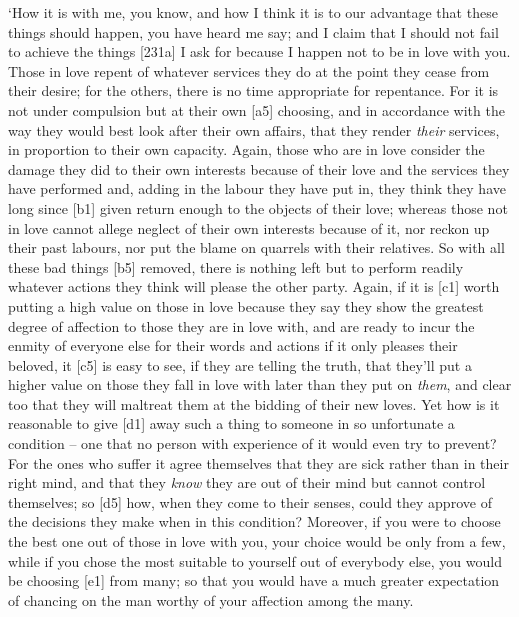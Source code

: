 ‘How it is with me, you know, and how I think it is to our advantage
that these things should
happen, you have heard me say; and I claim that I should not fail to
achieve the things {[}231a{]} I ask for because I happen not to be in
love with you. Those in love repent of whatever services they do at the
point they cease from their desire; for the others, there is no time
appropriate for repentance. For it is not under compulsion but at their
own {[}a5{]} choosing, and in accordance with the way they would best
look after their own affairs, that they render {\em their} services, in
proportion to their own
capacity. Again, those
who are in love consider the damage they did to their own interests
because of their love and the services they have performed and, adding
in the labour they have put in, they think they have long since {[}b1{]}
given return enough to the objects of their love; whereas those not in
love cannot allege neglect of their own interests because of it, nor
reckon up their past labours, nor put the blame on quarrels with their
relatives. So with all these bad things {[}b5{]} removed, there is
nothing left but to perform readily whatever actions they think will
please the other party.
Again, if it is {[}c1{]} worth putting a high value on those in love
because they say they show the greatest degree of affection to those
they are in love with, and are ready to incur the enmity of everyone
else for their words and
actions if it only pleases their beloved, it {[}c5{]} is easy to see, if
they are telling the truth, that they'll put a higher value on those
they fall in love with later than they put on {\em them}, and clear too
that they will maltreat them at the bidding of their new loves. Yet how
is it reasonable to give {[}d1{]} away such a
thing to someone in so
unfortunate a condition -- one that no person with experience of it
would even try to prevent? For the ones who suffer it agree themselves
that they are sick rather than in their right mind, and that they
{\em know} they are out of their mind but cannot control themselves; so
{[}d5{]} how, when they come to their senses, could they approve of the
decisions they make when in this condition? Moreover, if you were to
choose the best one out of those in love with you, your choice would be
only from a few, while if you chose the most suitable to yourself out of
everybody else, you would be choosing {[}e1{]} from many; so that you
would have a much greater expectation of chancing on the man worthy of
your affection among the
many.

